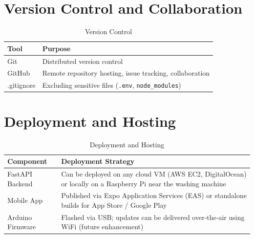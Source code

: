 \section{Version Control and Collaboration}
\begin{table}[H]
    \centering
    \begin{tabular}{|l|l|}
        \hline
        \textbf{Tool} & \textbf{Purpose} \\
        \hline
        Git & Distributed version control \\
        \hline
        GitHub & Remote repository hosting, issue tracking, collaboration \\
        \hline
        .gitignore & Excluding sensitive files (\texttt{.env}, \texttt{node\_modules}) \\
        \hline
    \end{tabular}
    \caption{Version Control}
    \label{tab:vc}
\end{table}

\section{Deployment and Hosting}
\begin{table}[H]
    \centering
    \small
    \begin{tabularx}{\textwidth}{|l|X|}
        \hline
        \textbf{Component} & \textbf{Deployment Strategy} \\
        \hline
        FastAPI Backend & Can be deployed on any cloud VM (AWS EC2, DigitalOcean) or locally on a Raspberry Pi near the washing machine \\
        \hline
        Mobile App & Published via Expo Application Services (EAS) or standalone builds for App Store / Google Play \\
        \hline
        Arduino Firmware & Flashed via USB; updates can be delivered over‑the‑air using WiFi (future enhancement) \\
        \hline
    \end{tabularx}
    \caption{Deployment and Hosting}
    \label{tab:deploy}
\end{table}

